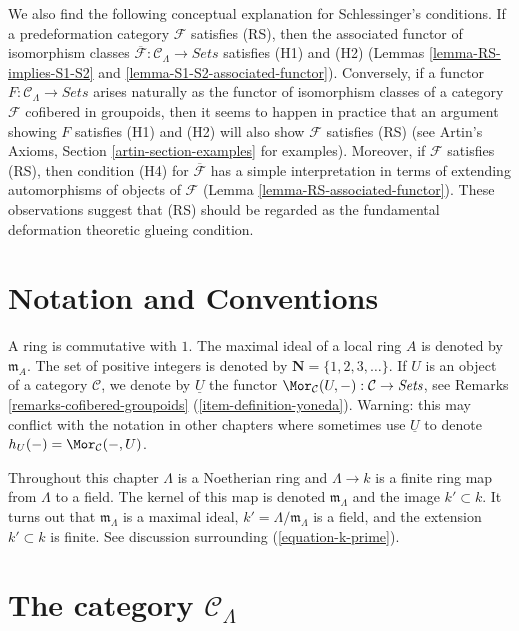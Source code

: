 \medskip\noindent
We also find the following conceptual explanation for Schlessinger's
conditions. If a predeformation category $\mathcal{F}$ satisfies (RS),
then the associated functor of isomorphism classes
$\overline{\mathcal{F}}: \mathcal{C}_\Lambda \to \textit{Sets}$
satisfies (H1) and (H2)
(Lemmas \ref{lemma-RS-implies-S1-S2} and
\ref{lemma-S1-S2-associated-functor}).
Conversely, if a functor
$F : \mathcal{C}_\Lambda \to \textit{Sets}$
arises naturally as the functor of isomorphism classes of
a category $\mathcal{F}$ cofibered in groupoids, then it seems to happen in
practice that an argument showing $F$ satisfies (H1) and (H2) will also show
$\mathcal{F}$ satisfies (RS) (see
Artin's Axioms, Section \ref{artin-section-examples}
for examples). Moreover, if $\mathcal{F}$ satisfies (RS), then condition
(H4) for $\overline{\mathcal{F}}$ has a simple interpretation in terms of
extending automorphisms of objects of $\mathcal{F}$
(Lemma \ref{lemma-RS-associated-functor}).
These observations suggest that (RS) should be regarded as the
fundamental deformation theoretic glueing condition.




\section{Notation and Conventions}
\label{section-notations-conventions}

\noindent
A ring is commutative with $1$. The  maximal ideal of a local ring $A$
is denoted by $\mathfrak{m}_A$. The set of positive integers is denoted
by $\mathbf{N} = \{1, 2, 3, \dots\}$. If $U$ is an object of a
category $\mathcal{C}$, we denote by $\underline{U}$
the functor
$\Mor_\mathcal{C}(U, -): \mathcal{C} \to \textit{Sets}$, see
Remarks \ref{remarks-cofibered-groupoids} (\ref{item-definition-yoneda}).
Warning: this may conflict with the notation in other chapters where sometimes
use $\underline{U}$ to denote $h_U(-) = \Mor_\mathcal{C}(-, U)$.

\medskip\noindent
Throughout this chapter $\Lambda$ is a Noetherian ring and
$\Lambda \to k$ is a finite ring map from $\Lambda$ to a field.
The kernel of this map is denoted $\mathfrak m_\Lambda$ and the
image $k' \subset k$. It turns out that $\mathfrak m_\Lambda$ is
a maximal ideal, $k' = \Lambda/\mathfrak m_\Lambda$ is a field, and
the extension $k' \subset k$ is finite. See discussion surrounding
(\ref{equation-k-prime}).


\section{The category $\mathcal{C}_\Lambda$}
\label{section-CLambda}

